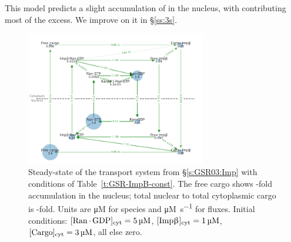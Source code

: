 \documentclass[12pt,notitlepage]{article}
\begin{document}
%

This model predicts a slight accumulation
of  in the nucleus,
with  contributing most of the excess.
%
%
We improve on it in \S\ref{ss:3s}.


\begin{figure}
\centering
\includegraphics[width=0.7\textwidth]{20210225-GSR/v2/python/graph/onion}
\caption{%
	Steady-state of 
	the transport system from 
	\S\ref{s:GSR03:Imp}
	with conditions 
	of Table~\ref{t:GSR-ImpB-const}.
	The free cargo
	shows 
	\protect\unskip%
	-fold accumulation
	in the nucleus;
	total nuclear to total cytoplasmic cargo
	is
	\protect\unskip%
	-fold.
	Units are \si{\micro M} for species
	and \si{\micro M . s^{-1}} for fluxes.
	Initial conditions:
	$[\ce{Ran . GDP}]_\text{cyt} = \SI{5}{\micro M}$,
	$[\ce{Imp\beta}]_\text{cyt} = \SI{1}{\micro M}$,
	$[\ce{Cargo}]_\text{cyt} = \SI{3}{\micro M}$,
	all else zero.
}
\label{f:GSR-v2}
\end{figure}
\end{document}
